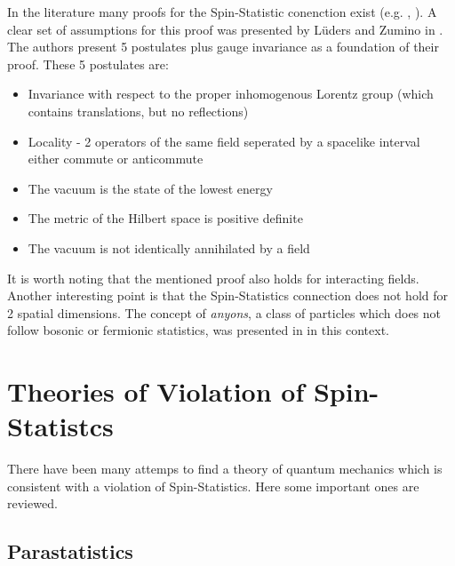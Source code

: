 In the literature many proofs for the Spin-Statistic conenction exist (e.g. \cite{Pauli1940}, \cite{Schwinger1958}). A clear set of assumptions for this proof was presented by Lüders and Zumino in \cite{Luders1958}. The authors present 5 postulates plus gauge invariance as a foundation of their proof. These 5 postulates are:
\begin{itemize}
 \item Invariance with respect to the proper inhomogenous Lorentz group (which contains translations, but no reflections)
 \item Locality - 2 operators of the same field seperated by a spacelike interval either commute or anticommute
 \item The vacuum is the state of the lowest energy
 \item The metric of the Hilbert space is positive definite
 \item The vacuum is not identically annihilated by a field
\end{itemize}
It is worth noting that the mentioned proof also holds for interacting fields. Another interesting point is that the Spin-Statistics connection does not hold for 2 spatial dimensions. The concept of \textit{anyons}, a class of particles which does not follow bosonic or fermionic statistics, was presented in \cite{Stern2008} in this context.

\section{Theories of Violation of Spin-Statistcs}

There have been many attemps to find a theory of quantum mechanics which is consistent with a violation of Spin-Statistics. Here some important ones are reviewed.

\subsection{Parastatistics}

